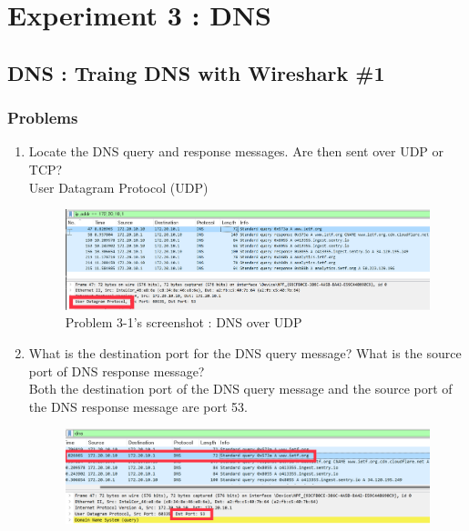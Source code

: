 \section{Experiment 3 : DNS}
\subsection{DNS : Traing DNS with Wireshark \#1}
    \subsubsection*{Problems}
    \begin{enumerate}[label=\bfseries Problem \arabic*:,leftmargin=*,labelindent=1em]
        \item Locate the DNS query and response messages. Are then sent over UDP or TCP?\\[0.2mm]
            \soln User Datagram Protocol (UDP)
            \vspace{-2mm}  
            \begin{figure}[!h]\centering
        		\includegraphics[width=.78\textwidth]{image/result_week01/Q3-1.png}
        		\caption{\footnotesize Problem 3-1's screenshot : DNS over UDP}
        		\vspace{-10pt}
            \end{figure}
        \item What is the destination port for the DNS query message? 
        What is the source port of DNS response message?\\[0.2mm]
            \soln Both the destination port of the DNS query message and the source port of the DNS response message are port 53.
            \vspace{-2mm}  
            \begin{figure}[!h]\centering
        		\includegraphics[width=.78\textwidth]{image/result_week01/Q3-2-1.png}

\end{figure}
\end{enumerate}
